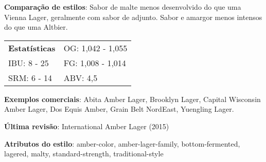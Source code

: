 \textbf{Comparação de estilos}: Sabor de malte menos desenvolvido do que uma Vienna Lager, geralmente com sabor de adjunto. Sabor e amargor menos intensos do que uma Altbier.

\begin{tabular}{@{}p{35mm}p{35mm}@{}}
  \textbf{Estatísticas} & OG: 1,042 - 1,055 \\
  IBU: 8 - 25 & FG: 1,008 - 1,014 \\
  SRM: 6 - 14 & ABV: 4,5%
\end{tabular}

\textbf{Exemplos comerciais}: Abita Amber Lager, Brooklyn Lager, Capital Wisconsin Amber Lager, Dos Equis Amber, Grain Belt NordEast, Yuengling Lager.

\textbf{Última revisão}: International Amber Lager (2015)

\textbf{Atributos do estilo}: amber-color, amber-lager-family, bottom-fermented, lagered, malty, standard-strength, traditional-style